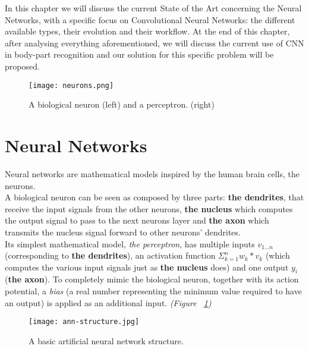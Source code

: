 \documentclass[../main.tex]{subfiles}
\begin{document}
\label{stateofart}
\thispagestyle{empty}


In this chapter we will discuss the current State of the Art concerning the Neural Networks, with a specific focus on Convolutional Neural Networks: the different available types, their evolution and their workflow. At the end of this chapter, after analysing everything aforementioned, we will discuss the current use of CNN  in body-part recognition and our solution for this specific problem will be proposed. \\ 

\vspace{5mm}
\clearpage
\newpage

\begin{figure}[H]
  \centering
  \texttt{[image: neurons.png]}
  \caption{A biological neuron (left) and a perceptron. (right) \cite{Bio}}
  \label{fig:neuron}
\end{figure}


\section{Neural Networks}
Neural networks are mathematical models inspired by the human brain cells, the neurons. \\ 
A biological neuron can be seen as composed by three parts: \textbf{the dendrites}, that receive the input signals from the other neurons, \textbf{the nucleus} which computes the output signal to pass to the next neurons layer and \textbf{the axon} which transmits the nucleus signal forward to other neurons' dendrites. \\
Its simplest mathematical model, \textit{the perceptron}, has multiple inputs $v_{1...n}$ (corresponding to \textbf{the dendrites}), an activation function $\Sigma_{k=1}^n w_k*v_k$ (which computes the various input signals just as \textbf{the nucleus} does) and one output $y_i$ (\textbf{the axon}). To completely mimic the biological neuron, together with its action potential, a \textit{bias} (a real number representing the minimum value required to have an output) is applied as an additional input. \textit{(Figure ~\ref{fig:neuron})}


\begin{figure}[!b]
  \centering
  \texttt{[image: ann-structure.jpg]}
  \caption{A basic artificial neural network structure. \cite{ANN}}
  \label{fig:ann-structure}
\end{figure}
\end{document}
